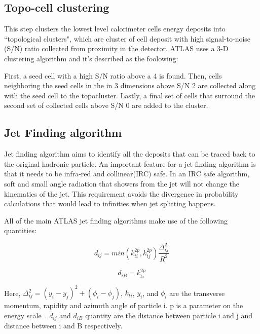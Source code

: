 % 
\subsection*{Topo-cell clustering}
\label{Topocell clustering}
This step clusters the lowest level calorimeter cells energy deposits into ``topological clusters", which are cluster of cell deposit with high signal-to-noise (S/N) ratio collected from proximity in the detector. ATLAS uses a 3-D clustering algorithm and it's described as the foolowing:

First, a seed cell with a high S/N ratio above a 4 is found. Then, cells neighboring the seed cells in the in 3 dimensions above S/N 2 are collected along with the seed cell to the topocluster. Lastly, a final set of cells that surround the second set of collected cells above S/N 0  are added to the cluster. 

\subsection*{Jet Finding algorithm}
\label{sec:JetFinding}

Jet finding algorithm aims to identify all the deposits that can be traced back to the original hadronic particle. An important feature for a jet finding algorithm is that it needs to be infra-red and collinear(IRC) safe. In an IRC safe algorithm, soft and small angle radiation that showers from the jet will not change the kinematics of the jet. This requirement avoids the divergence in probability calculations that would lead to infinities when jet splitting happens.

All of the main ATLAS jet finding algorithms make use of the following quantities:

\begin{equation}
    d_{ij} = min(k_{ti}^{2p}, k_{tj}^{2p}) \frac{\Delta_{ij}^{2}}{R^{2}}
    \label{sec:topo}
\end{equation}

\begin{equation}
    d_{iB} = k^{2p}_{ti}
\end{equation}

Here, $\Delta_{ij}^{2} = (y_{i}- y_{j})^2 + (\phi_{i} - \phi_{j})$, $k_{ti}
$, $y_{i}$, and $\phi_{i}$ are the transverse momentum, rapidity and azimuth angle of particle i. p is a parameter on the energy scale~\cite{HEP2008}. $d_{ij}$ and $d_{iB}$ quantity are the distance between particle i and j and distance between i and B respectively. 

